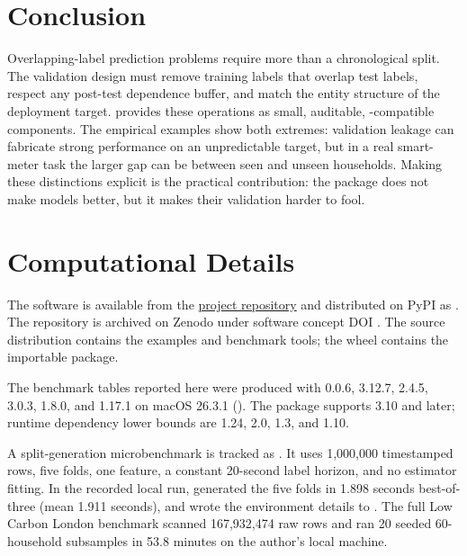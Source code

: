\documentclass[article]{jdssv}
\newcommand{\pcv}{\pkg{purgedcv}}
\begin{document}
\section{Conclusion}

Overlapping-label prediction problems require more than a chronological split.
The validation design must remove training labels that overlap test labels,
respect any post-test dependence buffer, and match the entity structure of the
deployment target. \pcv{} provides these operations as small, auditable,
-compatible components. The empirical examples show both
extremes: validation leakage can fabricate strong performance on an
unpredictable target, but in a real smart-meter task the larger gap can be
between seen and unseen households. Making these distinctions explicit is the
practical contribution: the package does not make models better, but it makes
their validation harder to fool.

\section*{Computational Details}

The software is available from the
\href{https://github.com/eslazarev/purged-cross-validation}{project repository}
and distributed on PyPI as . The repository is archived on Zenodo
under software concept DOI . The source
distribution contains the examples and benchmark tools; the wheel contains the
importable \pcv{} package.

The benchmark tables reported here were produced with \pcv{} 0.0.6,
 3.12.7,  2.4.5,  3.0.3,
 1.8.0, and  1.17.1 on macOS 26.3.1
(). The package supports  3.10 and later; runtime
dependency lower bounds are  1.24,  2.0,
 1.3, and  1.10.

A split-generation microbenchmark is tracked as . It
uses 1,000,000 timestamped rows, five folds, one feature, a constant 20-second
label horizon, and no estimator fitting. In the recorded local run,
 generated the five folds in 1.898 seconds best-of-three
(mean 1.911 seconds), and wrote the environment details to
. The full Low Carbon London
benchmark scanned 167,932,474 raw rows and ran 20 seeded 60-household
subsamples in 53.8 minutes on the author's local machine.
\end{document}
